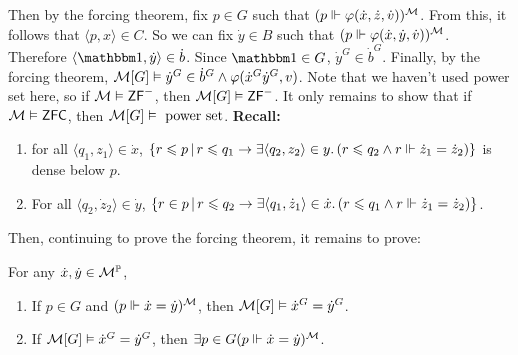 \documentclass{article}
\begin{document}
    Then by the forcing theorem, fix $p \in G$ such that $(p \Vdash \varphi(\dot{x}, \dot{z}, \dot{v}))^{\mathcal{M}}$. From this, it follows that $\langle p, x \rangle \in C$. So we can fix $\dot{y} \in B$ such that $(p \Vdash \varphi(\dot{x},\dot{y},\dot{v}))^{\mathcal{M}}$. Therefore $\langle \bbone, \dot{y} \rangle \in \dot{b}$. Since $\bbone \in G$, $\dot{y}^{G} \in \dot{b}^{G}$. Finally, by the forcing theorem, $\mathcal{M}[G] \vDash \dot{y}^{G} \in \dot{b}^{G} \wedge \varphi(\dot{x}^{G} \dot{y}^{G}, v)$.
    Note that we haven't used power set here, so if $\mathcal{M} \vDash \mathsf{ZF}^{-}$, then $\mathcal{M}[G] \vDash \mathsf{ZF}^{-}$.\endproof
    \newlec
    It only remains to show that if $\mathcal{M} \vDash \mathsf{ZFC}$, then $\mathcal{M}[G] \vDash \text{ power set}$.\gap
    \textbf{Recall:} \begin{enumerate}
        \item[(a)] for all $\langle q_{1}, z_{1} \rangle \in \dot{x}$, $\{r \leqslant p \, | \, r \leqslant q_{1} \rightarrow \exists \langle q_{2}, z_{2}\rangle \in y. \, (r \leqslant q_{2} \wedge r \Vdash \dot{z}_{1} = \dot{z}_{2}) \}$ is dense below $p$.
        \item[(b)] For all $\langle q_{2}, \dot{z}_{2}\rangle \in \dot{y}$, $\{ r \in p \, | \, r \leqslant q_{2} \rightarrow \exists \langle q_{1}, \dot{z}_{1} \rangle \in \dot{x}. \, (r \leqslant q_{1} \wedge r \Vdash \dot{z}_{1} = \dot{z}_{2})\}$.
    \end{enumerate}
    Then, continuing to prove the forcing theorem, it remains to prove:
    \begin{fancylem}
        For any $\dot{x}, \dot{y} \in \mathcal{M}^{\mathbb{P}}$, \begin{enumerate}
            \item[(i)] If $p \in G$ and $(p \Vdash \dot{x} = \dot{y})^{\mathcal{M}}$, then $\mathcal{M}[G] \vDash \dot{x}^{G} = \dot{y}^{G}$.
            \item[(ii)] If $\mathcal{M}[G] \vDash \dot{x}^{G} = \dot{y}^{G}$, then $\exists p \in G (p \Vdash \dot{x} = \dot{y})^{\mathcal{M}}$.
        \end{enumerate}
    \end{fancylem}
\end{document}
